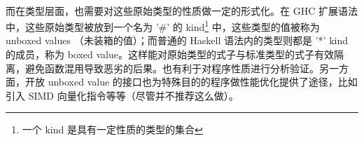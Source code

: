 \documentclass{article}
\begin{document}
	\paragraph{}
	而在类型层面，也需要对这些原始类型的性质做一定的形式化。在 GHC 扩展语法中，这些原始类型被放到一个名为 '\#' 的 kind\footnote{一个 kind 是具有一定性质的类型的集合} 中，这些类型的值被称为 unboxed values （未装箱的值）；而普通的 Haskell 语法内的类型则都是 '*' kind 的成员，称为 boxed value。这样能对原始类型的式子与标准类型的式子有效隔离，避免函数混用导致恶劣的后果。也有利于对程序性质进行分析验证。另一方面，开放 unboxed value 的接口也为特殊目的的程序做性能优化提供了途径，比如引入 SIMD 向量化指令等等（尽管并不推荐这么做）。
	\medskip
	
	
\end{document}
